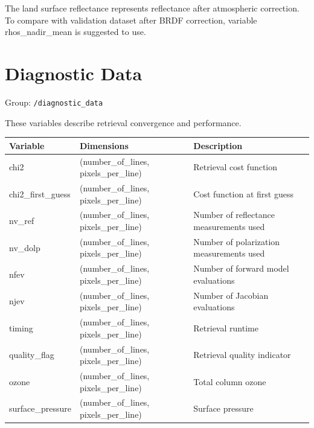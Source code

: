 \documentclass[
  11pt,
  letterpaper,
  DIV=11,
  numbers=noendperiod]{scrreprt}
\begin{document}
The land surface reflectance represents reflectance after atmospheric
correction. To compare with validation dataset after BRDF correction,
variable rhos\_nadir\_mean is suggested to use.

\section{Diagnostic Data}\label{diagnostic-data}

Group: \texttt{/diagnostic\_data}

These variables describe retrieval convergence and performance.

\begin{longtable}[]{@{}
  >{\raggedright\arraybackslash}p{}
  >{\raggedright\arraybackslash}p{}
  >{\raggedright\arraybackslash}p{}@{}}
\toprule\noalign{}
\begin{minipage}[b]{\linewidth}\raggedright
Variable
\end{minipage} & \begin{minipage}[b]{\linewidth}\raggedright
Dimensions
\end{minipage} & \begin{minipage}[b]{\linewidth}\raggedright
Description
\end{minipage} \\
\midrule\noalign{}
\endhead
\bottomrule\noalign{}
\endlastfoot
chi2 & (number\_of\_lines, pixels\_per\_line) & Retrieval cost
function \\
chi2\_first\_guess & (number\_of\_lines, pixels\_per\_line) & Cost
function at first guess \\
nv\_ref & (number\_of\_lines, pixels\_per\_line) & Number of reflectance
measurements used \\
nv\_dolp & (number\_of\_lines, pixels\_per\_line) & Number of
polarization measurements used \\
nfev & (number\_of\_lines, pixels\_per\_line) & Number of forward model
evaluations \\
njev & (number\_of\_lines, pixels\_per\_line) & Number of Jacobian
evaluations \\
timing & (number\_of\_lines, pixels\_per\_line) & Retrieval runtime \\
quality\_flag & (number\_of\_lines, pixels\_per\_line) & Retrieval
quality indicator \\
ozone & (number\_of\_lines, pixels\_per\_line) & Total column ozone \\
surface\_pressure & (number\_of\_lines, pixels\_per\_line) & Surface
pressure \\
\end{longtable}
\end{document}
